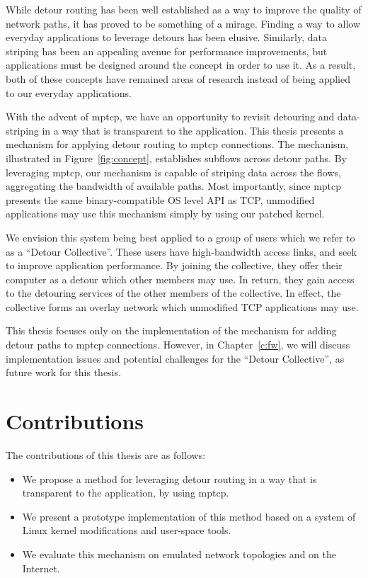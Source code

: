 \documentclass{cwru}
\begin{document}
While detour routing has been well established as a way to improve the quality
of network paths, it has proved to be something of a mirage. Finding a way to
allow everyday applications to leverage detours has been elusive. Similarly,
data striping has been an appealing avenue for performance improvements, but
applications must be designed around the concept in order to use it. As a
result, both of these concepts have remained areas of research instead of being
applied to our everyday applications.

With the advent of \ac{mptcp}, we have an opportunity to revisit detouring and
data-striping in a way that is transparent to the application. This thesis
presents a mechanism for applying detour routing to \ac{mptcp} connections. The
mechanism, illustrated in Figure~\ref{fig:concept}, establishes subflows across
detour paths. By leveraging \ac{mptcp}, our mechanism is capable of striping
data across the flows, aggregating the bandwidth of available paths. Most
importantly, since \ac{mptcp} presents the same binary-compatible OS level API
as TCP, unmodified applications may use this mechanism simply by using our
patched kernel.

We envision this system being best applied to a group of users which we refer to
as a ``Detour Collective''. These users have high-bandwidth access links, and
seek to improve application performance. By joining the collective, they offer
their computer as a detour which other members may use. In return, they gain
access to the detouring services of the other members of the collective. In
effect, the collective forms an overlay network which unmodified TCP
applications may use.

This thesis focuses only on the implementation of the mechanism for adding
detour paths to \ac{mptcp} connections. However, in Chapter~\ref{c:fw}, we will
discuss implementation issues and potential challenges for the ``Detour
Collective'', as future work for this thesis.

\section{Contributions}

The contributions of this thesis are as follows:

\begin{itemize}
\item We propose a method for leveraging detour routing in a way that is
  transparent to the application, by using \ac{mptcp}.
\item We present a prototype implementation of this method based on a system of
  Linux kernel modifications and user-space tools.
\item We evaluate this mechanism on emulated network topologies and on the
  Internet.
\end{itemize}
\end{document}
